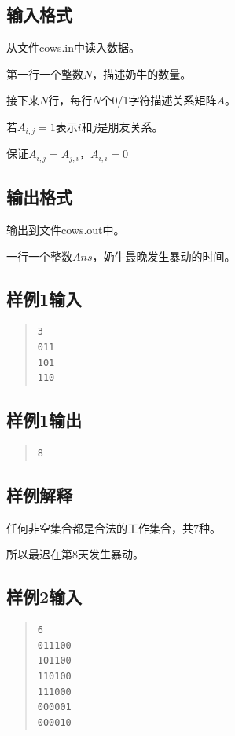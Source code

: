 \documentclass[12pt, a4paper]{article}
\begin{document}
\subsection{输入格式}
	
从文件cows.in中读入数据。

第一行一个整数$N$，描述奶牛的数量。

接下来$N$行，每行$N$个0/1字符描述关系矩阵$A$。

若$A_{i,j}=1$表示$i$和$j$是朋友关系。

保证$A_{i,j}=A_{j,i}$，$A_{i,i}=0$

\subsection{输出格式}

输出到文件cows.out中。

一行一个整数$Ans$，奶牛最晚发生暴动的时间。

\subsection{样例1输入}
\begin{quote}
\begin{verbatim}
3
011
101
110
\end{verbatim}
\end{quote}
\subsection{样例1输出}
\begin{quote}
\begin{verbatim}
8
\end{verbatim}
\end{quote}
\subsection{样例解释}

任何非空集合都是合法的工作集合，共$7$种。

所以最迟在第$8$天发生暴动。

\subsection{样例2输入}
\begin{quote}
\begin{verbatim}
6
011100
101100
110100
111000
000001
000010
\end{verbatim}
\end{quote}
\end{document}
